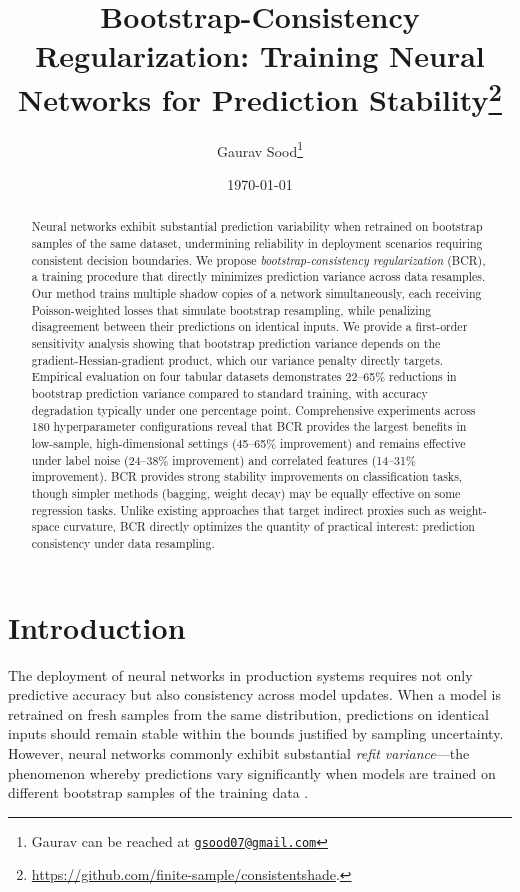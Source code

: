 \documentclass[12pt, letterpaper]{article}
\title{Bootstrap-Consistency Regularization: Training Neural Networks for Prediction Stability\thanks{\href{https://github.com/finite-sample/consistentshade}{https://github.com/finite-sample/consistentshade}.}}
\author{Gaurav Sood\thanks{Gaurav can be reached at \href{mailto:gsood07@gmail.com}{\footnotesize{\texttt{gsood07@gmail.com}}}}\vspace{.5cm}}
\date{\today}
\begin{document}
\maketitle

\begin{abstract}
Neural networks exhibit substantial prediction variability when retrained on bootstrap samples of the same dataset, undermining reliability in deployment scenarios requiring consistent decision boundaries. We propose \emph{bootstrap-consistency regularization} (BCR), a training procedure that directly minimizes prediction variance across data resamples. Our method trains multiple shadow copies of a network simultaneously, each receiving Poisson-weighted losses that simulate bootstrap resampling, while penalizing disagreement between their predictions on identical inputs. We provide a first-order sensitivity analysis showing that bootstrap prediction variance depends on the gradient-Hessian-gradient product, which our variance penalty directly targets. Empirical evaluation on four tabular datasets demonstrates 22--65\% reductions in bootstrap prediction variance compared to standard training, with accuracy degradation typically under one percentage point. Comprehensive experiments across 180 hyperparameter configurations reveal that BCR provides the largest benefits in low-sample, high-dimensional settings (45--65\% improvement) and remains effective under label noise (24--38\% improvement) and correlated features (14--31\% improvement). BCR provides strong stability improvements on classification tasks, though simpler methods (bagging, weight decay) may be equally effective on some regression tasks. Unlike existing approaches that target indirect proxies such as weight-space curvature, BCR directly optimizes the quantity of practical interest: prediction consistency under data resampling.
\end{abstract}

\section{Introduction}

The deployment of neural networks in production systems requires not only predictive accuracy but also consistency across model updates. When a model is retrained on fresh samples from the same distribution, predictions on identical inputs should remain stable within the bounds justified by sampling uncertainty. However, neural networks commonly exhibit substantial \emph{refit variance}---the phenomenon whereby predictions vary significantly when models are trained on different bootstrap samples of the training data \citep{efron1979bootstrap}.
\end{document}
